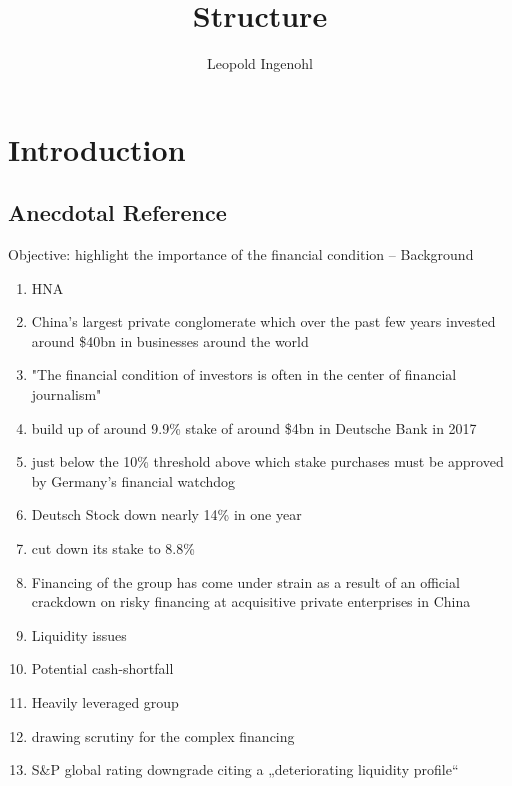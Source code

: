\documentclass[12pt]{article}
\title{Structure}
\author{Leopold Ingenohl}
\begin{document}
\maketitle

\section{Introduction}

\subsection{Anecdotal Reference}
\begin{center} 
Objective: highlight the importance of the financial condition -- Background
\end{center}

    \begin{enumerate}
		\item HNA
		\item China’s largest private conglomerate which over the past few years invested around \$40bn in businesses around the world 
        \item "The financial condition of investors is often in the center of financial journalism"
        \item build up of around 9.9\% stake of around \$4bn in Deutsche Bank in 2017 
        \item just below the 10\% threshold above which stake purchases must be approved by Germany’s financial watchdog 
		\item Deutsch Stock down nearly 14\% in one year
		\item cut down its stake to 8.8\%
		
        \item Financing of the group has come under strain as a result of an official crackdown on risky financing at acquisitive private enterprises in China 
		\item Liquidity issues 
		\item Potential cash-shortfall 
        \item Heavily leveraged group
        \item drawing scrutiny for the complex financing
		\item S\&P global rating downgrade citing a „deteriorating liquidity profile“
		
    \end{enumerate}
\end{document}
